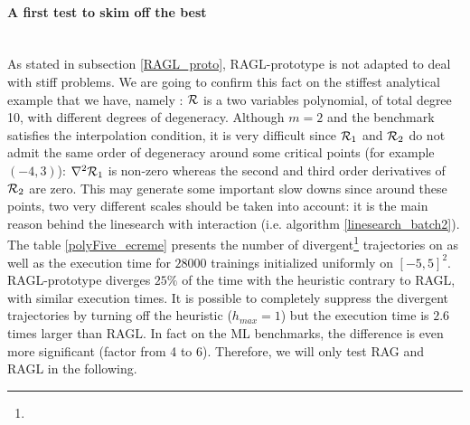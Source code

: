 \paragraph{A first test to skim off the best}
~~\\
As stated in subsection \ref{RAGL_proto}, RAGL-prototype is not adapted to deal with stiff
problems. We are going to confirm this fact on the stiffest analytical example that we have, namely \polyFive: $\mathcal{R}$ is a two variables polynomial, of total degree 10, with
different degrees of degeneracy. Although $m=2$ and the benchmark satisfies the interpolation condition, it is very difficult since $\mathcal{R}_1$ and $\mathcal{R}_2$ do not admit the same order of
degeneracy around some critical points (for example $(-4,3)$): $\nabla^2 \mathcal{R}_1$ is non-zero whereas the second and third order derivatives of $\mathcal{R}_2$ are zero. This may generate some
important slow downs since around these points, two very different scales should be taken into account: it is the main reason behind the linesearch with interaction (i.e.
algorithm \ref{linesearch_batch2}). \\
The table \ref{polyFive_ecreme} presents the number of divergent\footnote{} trajectories on \polyFive as well as the execution time for $28000$ trainings initialized uniformly on $[-5,5]^2$.
RAGL-prototype diverges $25 \%$ of the time with the heuristic contrary to RAGL, with similar execution times. It is possible to completely suppress the divergent trajectories by turning off the heuristic ($h_{max}=1$) but the execution time is $2.6$ times larger than RAGL. In fact on the ML benchmarks, the difference is even more significant (factor from 4 to 6). Therefore, we will only test RAG and RAGL in the following.


